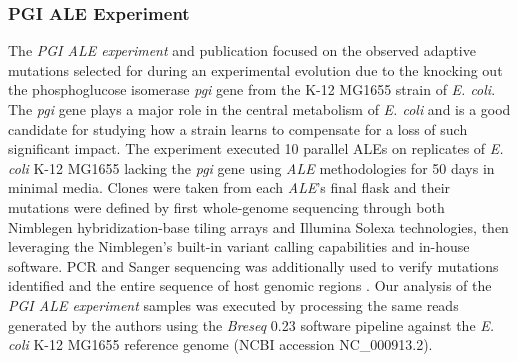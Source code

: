\documentclass[12pt,final,masters,chapterheads]{ucsd}  %
\begin{document}
\subsubsection{PGI ALE Experiment}
%
%
The \textit{PGI ALE experiment} and publication focused on the observed adaptive mutations selected for during an experimental evolution due to the knocking out the phosphoglucose isomerase \textit{pgi} gene from the K-12 MG1655 strain of \textit{E. coli}. The \textit{pgi} gene plays a major role in the central metabolism of \textit{E. coli} and is a good candidate for studying how a strain learns to compensate for a loss of such significant impact. The experiment executed 10 parallel ALEs on replicates of \textit{E. coli} K-12 MG1655 lacking the \textit{pgi} gene using \textit{ALE} methodologies for 50 days in minimal media. Clones were taken from each \textit{ALE}'s final flask and their mutations were defined by first whole-genome sequencing through both Nimblegen hybridization-base tiling arrays and Illumina Solexa technologies, then leveraging the Nimblegen's built-in variant calling capabilities and in-house software. PCR and Sanger sequencing was additionally used to verify mutations identified and the entire sequence of host genomic regions \cite{10.1371/journal.pgen.1001186}. Our analysis of the \textit{PGI ALE experiment} samples was executed by processing the same reads generated by the authors using the \textit{Breseq} 0.23 software pipeline against the \textit{E. coli} K-12 MG1655 reference genome (NCBI accession NC\_000913.2).
%
%
%
%
\end{document}

